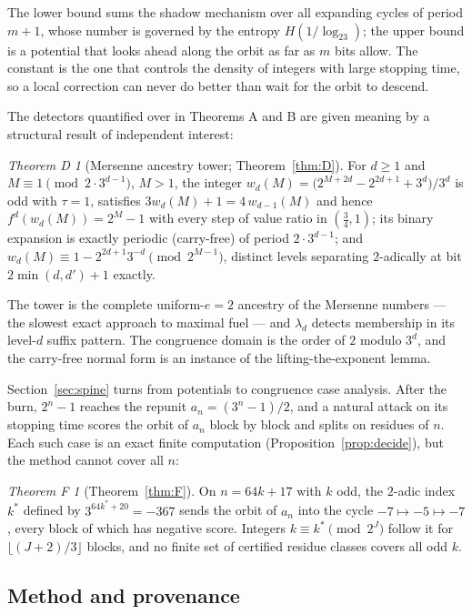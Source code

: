 \documentclass[11pt]{article}
\theoremstyle{definition}
\theoremstyle{remark}
\newtheorem*{thmD}{Theorem D}
\newtheorem*{thmF}{Theorem F}
\begin{document}
The lower bound sums the shadow mechanism over all expanding cycles of
period $m+1$, whose number is governed by the entropy $H(1/\log_23)$;
the upper bound is a potential that looks ahead along the orbit as far
as $m$ bits allow. The constant is the one that controls the density of
integers with large stopping time, so a local correction can never do
better than wait for the orbit to descend.

The detectors quantified over in Theorems A and B are given meaning by
a structural result of independent interest:

\begin{thmD}[Mersenne ancestry tower; Theorem~\ref{thm:D}]
For $d\ge1$ and $M\equiv1\pmod{2\cdot3^{d-1}}$, $M>1$, the integer
$w_d(M)=\bigl(2^{M+2d}-2^{2d+1}+3^{d}\bigr)/3^{d}$ is odd with
$\tau=1$, satisfies $3w_d(M)+1=4\,w_{d-1}(M)$ and hence
$f^{d}(w_d(M))=2^{M}-1$ with every step of value ratio in
$(\tfrac34,1)$; its binary expansion is exactly periodic (carry-free)
of period $2\cdot3^{d-1}$; and $w_d(M)\equiv1-2^{2d+1}3^{-d}
\pmod{2^{M-1}}$, distinct levels separating $2$-adically at bit
$2\min(d,d')+1$ exactly.
\end{thmD}

The tower is the complete uniform-$e{=}2$ ancestry of the Mersenne
numbers --- the slowest exact approach to maximal fuel --- and
$\lambda_d$ detects membership in its level-$d$ suffix pattern. The
congruence domain is the order of $2$ modulo $3^d$, and the carry-free
normal form is an instance of the lifting-the-exponent lemma.

Section~\ref{sec:spine} turns from potentials to congruence case
analysis. After the burn, $2^{n}-1$ reaches the repunit $a_n=(3^{n}-1)/2$,
and a natural attack on its stopping time scores the orbit of $a_n$ block
by block and splits on residues of $n$. Each such case is an exact finite
computation (Proposition~\ref{prop:decide}), but the method cannot cover
all $n$:

\begin{thmF}[Theorem~\ref{thm:F}]
On $n=64k+17$ with $k$ odd, the $2$-adic index $k^{*}$ defined by
$3^{64k^{*}+20}=-367$ sends the orbit of $a_n$ into the cycle
$-7\mapsto-5\mapsto-7$, every block of which has negative score. Integers
$k\equiv k^{*}\pmod{2^{J}}$ follow it for $\lfloor(J+2)/3\rfloor$ blocks,
and no finite set of certified residue classes covers all odd $k$.
\end{thmF}

\subsection*{Method and provenance}
\end{document}
